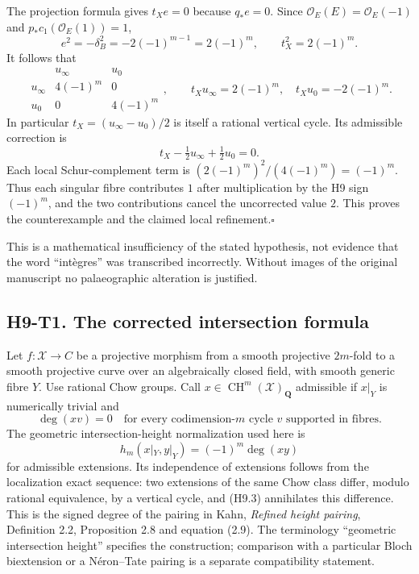 \documentclass[11pt,a4paper]{article}
\begin{document}
The projection formula gives $t_X e=0$ because $q_*e=0$. Since
$\mathcal O_E(E)=\mathcal O_E(-1)$ and $p_*c_1(\mathcal O_E(1))=1$,
\[
 e^2=-\delta_B^2=-2(-1)^{m-1}=2(-1)^m,
 \qquad t_X^2=2(-1)^m.
\]
It follows that
\[
 \begin{array}{c|cc}
  &u_\infty&u_0\\\hline
 u_\infty&4(-1)^m&0\\
 u_0&0&4(-1)^m
 \end{array},\qquad
 t_Xu_\infty=2(-1)^m,\quad t_Xu_0=-2(-1)^m.
                                                        \tag{H9.2}
\]
In particular $t_X=(u_\infty-u_0)/2$ is itself a rational vertical cycle.
Its admissible correction is
\[
 t_X-\tfrac12u_\infty+\tfrac12u_0=0.
\]
Each local Schur-complement term is
$(2(-1)^m)^2/(4(-1)^m)=(-1)^m$. Thus each singular fibre contributes $1$
after multiplication by the H9 sign $(-1)^m$, and the two contributions
cancel the uncorrected value $2$. This proves the counterexample and the
claimed local refinement.\hfill$\square$

This is a mathematical insufficiency of the stated hypothesis, not evidence
that the word ``int\`egres'' was transcribed incorrectly. Without images of
the original manuscript no palaeographic alteration is justified.

\subsection*{H9-T1. The corrected intersection formula}

Let $f:\mathcal X\to C$ be a projective morphism from a smooth projective
$2m$-fold to a smooth projective curve over an algebraically closed field,
with smooth generic fibre $Y$. Use rational Chow groups. Call
$x\in\operatorname{CH}^m(\mathcal X)_{\mathbf Q}$ admissible if
$x|_Y$ is numerically trivial and
\[
 \deg(xv)=0
 \quad\text{for every codimension-$m$ cycle $v$ supported in fibres.}
                                                        \tag{H9.3}
\]
The geometric intersection-height normalization used here is
\[
 h_m(x|_Y,y|_Y)=(-1)^m\deg(xy)                    \tag{H9.4}
\]
for admissible extensions. Its independence of extensions follows from
the localization exact sequence: two extensions of the same Chow class
differ, modulo rational equivalence, by a vertical cycle, and (H9.3)
annihilates this difference. This is the signed degree of the pairing in
Kahn, \emph{Refined height pairing}, Definition 2.2, Proposition 2.8 and
equation (2.9). The terminology ``geometric intersection height'' specifies
the construction; comparison with a particular Bloch biextension or a
N\'eron--Tate pairing is a separate compatibility statement.
\end{document}
